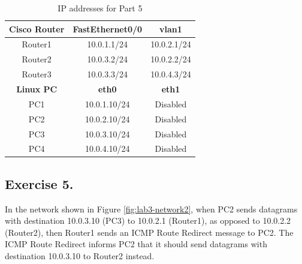 \begin{table}[h!t]
	\centering
	\begin{tabular}{| c | c | c |}	
		\hline
		\textbf{Cisco Router} & \textbf{FastEthernet0/0} & \textbf{vlan1} \\ \hline
		Router1 & 10.0.1.1/24 & 10.0.2.1/24 \\
		Router2 & 10.0.3.2/24 & 10.0.2.2/24 \\
		Router3 & 10.0.3.3/24 & 10.0.4.3/24 \\ \hline
		\textbf{Linux PC} & \textbf{eth0} & \textbf{eth1} \\ \hline
		PC1 & 10.0.1.10/24 & Disabled \\ 
		PC2 & 10.0.2.10/24 & Disabled \\
		PC3 & 10.0.3.10/24 & Disabled \\
		PC4 & 10.0.4.10/24 & Disabled \\ \hline
	\end{tabular}
	\caption{IP addresses for Part 5}
	\label{tab:lab3-network2}
\end{table}

\subsection*{Exercise 5.}
In the network shown in Figure \ref{fig:lab3-network2}, when PC2 sends datagrams with destination 10.0.3.10 (PC3) to 10.0.2.1 (Router1), as opposed to 10.0.2.2 (Router2), then Router1 sends an ICMP Route Redirect message to PC2. The ICMP Route Redirect informs PC2 that it should send datagrams with destination 10.0.3.10 to Router2 instead.

